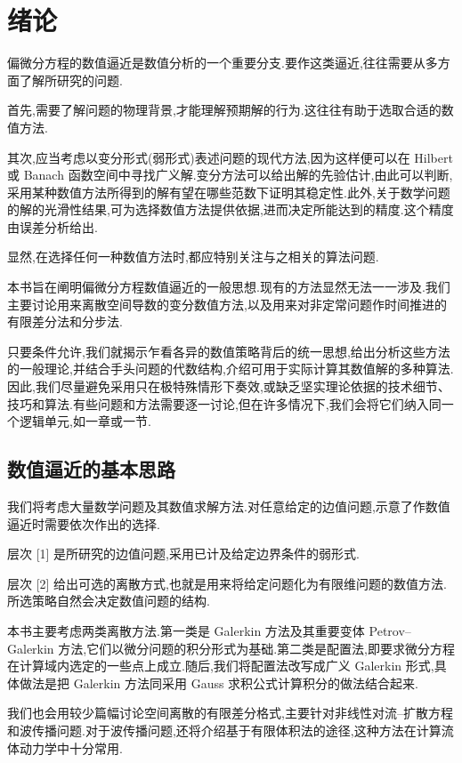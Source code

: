\chapter{绪论}\label{ch:1}

偏微分方程的数值逼近是数值分析的一个重要分支.要作这类逼近,往往需要从多方面了解所研究的问题.

首先,需要了解问题的物理背景,才能理解预期解的行为.这往往有助于选取合适的数值方法.

其次,应当考虑以变分形式(弱形式)表述问题的现代方法,因为这样便可以在 Hilbert 或 Banach 函数空间中寻找广义解.变分方法可以给出解的先验估计,由此可以判断,采用某种数值方法所得到的解有望在哪些范数下证明其稳定性.此外,关于数学问题的解的光滑性结果,可为选择数值方法提供依据,进而决定所能达到的精度.这个精度由误差分析给出.

显然,在选择任何一种数值方法时,都应特别关注与之相关的算法问题.

本书旨在阐明偏微分方程数值逼近的一般思想.现有的方法显然无法一一涉及.我们主要讨论用来离散空间导数的变分数值方法,以及用来对非定常问题作时间推进的有限差分法和分步法.

只要条件允许,我们就揭示乍看各异的数值策略背后的统一思想,给出分析这些方法的一般理论,并结合手头问题的代数结构,介绍可用于实际计算其数值解的多种算法.因此,我们尽量避免采用只在极特殊情形下奏效,或缺乏坚实理论依据的技术细节、技巧和算法.有些问题和方法需要逐一讨论,但在许多情况下,我们会将它们纳入同一个逻辑单元,如一章或一节.

\section{数值逼近的基本思路}\label{sec:1.1}

我们将考虑大量数学问题及其数值求解方法.对任意给定的边值问题,示意了作数值逼近时需要依次作出的选择.

层次 [1] 是所研究的边值问题,采用已计及给定边界条件的弱形式.

层次 [2] 给出可选的离散方式,也就是用来将给定问题化为有限维问题的数值方法.所选策略自然会决定数值问题的结构.

本书主要考虑两类离散方法.第一类是 Galerkin 方法及其重要变体 Petrov--Galerkin 方法,它们以微分问题的积分形式为基础.第二类是配置法,即要求微分方程在计算域内选定的一些点上成立.随后,我们将配置法改写成广义 Galerkin 形式,具体做法是把 Galerkin 方法同采用 Gauss 求积公式计算积分的做法结合起来.

我们也会用较少篇幅讨论空间离散的有限差分格式,主要针对非线性对流--扩散方程和波传播问题.对于波传播问题,还将介绍基于有限体积法的途径,这种方法在计算流体动力学中十分常用.

